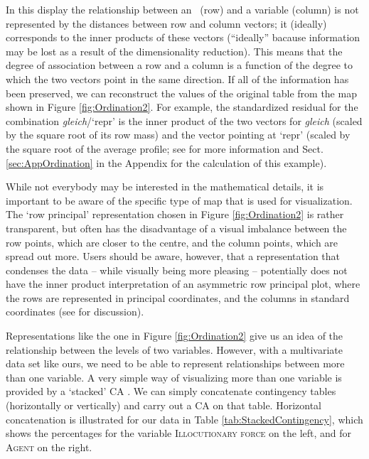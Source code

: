 
In this display the relationship between an \ipadv\ (row) and a
variable (column) is not represented by the distances between row and
column vectors; it (ideally) corresponds to the inner products of
these vectors (``ideally'' bacause information may be lost as a result
of the dimensionality reduction). This means that the degree of
association between a row and a column is a function of the degree to
which the two vectors point in the same direction. If all of the
information has been preserved, we can reconstruct the values
of the original table from the map shown in Figure
\ref{fig:Ordination2}. For example, the standardized residual for the
combination \textit{gleich}/`repr' is the inner product of the two
vectors for \textit{gleich} (scaled by the square root of its row
mass) and the vector pointing at `repr' (scaled by the square root of
the average profile; see \citealt{Greenacre2016} for more information
and Sect. \ref{sec:AppOrdination} in the Appendix for the calculation of this
example).

While not everybody may be interested in the mathematical details, it
is important to be aware of the specific type of map that is used for
visualization. The `row principal' representation chosen in Figure
\ref{fig:Ordination2} is rather transparent, but often has the
disadvantage of a visual imbalance between the row points, which are
closer to the centre, and the column points, which are spread out
more. Users should be aware, however, that a representation that
condenses the data -- while visually being more pleasing --
potentially does not have the inner product interpretation of an
asymmetric row principal plot, where the rows are represented in
principal coordinates, and the columns in standard coordinates (see
\citealt[Ch. 13]{Greenacre2016} for discussion).

Representations like the one in Figure \ref{fig:Ordination2} give us
an idea of the relationship between the levels of two
variables. However, with a multivariate data set like ours, we need to
be able to represent relationships between more than one variable. A
very simple way of visualizing more than one variable is provided by a
`stacked' CA \citep[Ch. 17]{Greenacre2016}. We can simply concatenate
contingency tables (horizontally or vertically) and carry out a CA on
that table. Horizontal concatenation is illustrated for our data in
Table \ref{tab:StackedContingency}, which shows the percentages for
the variable \textsc{Illocutionary force} on the left, and for
\textsc{Agent} on the right.

